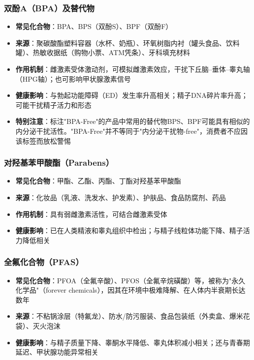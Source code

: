 \documentclass[12pt,a4paper,twoside]{ctexbook}
\begin{document}
\subsubsection{双酚A（BPA）及替代物}

\begin{itemize}[leftmargin=2cm]
	\item \textbf{常见化合物}：BPA、BPS（双酚S）、BPF（双酚F）
	\item \textbf{来源}：聚碳酸酯塑料容器（水杯、奶瓶）、环氧树脂内衬（罐头食品、饮料罐）、热敏收据纸（购物小票、ATM凭条）、牙科填充材料
	\item \textbf{作用机制}：雌激素受体激动剂，可模拟雌激素效应，干扰下丘脑--垂体--睾丸轴（HPG轴）；也可影响甲状腺激素信号
	\item \textbf{健康影响}：与勃起功能障碍（ED）发生率升高相关；精子DNA碎片率升高；可能干扰精子活力和形态
	\item \textbf{特别注意}：标注"BPA-Free"的产品中常用的替代物BPS、BPF可能具有相似的内分泌干扰活性。"BPA-Free"并不等同于"内分泌干扰物-free"，消费者不应因该标签而放松警惕
\end{itemize}

\subsubsection{对羟基苯甲酸酯（Parabens）}

\begin{itemize}[leftmargin=2cm]
	\item \textbf{常见化合物}：甲酯、乙酯、丙酯、丁酯对羟基苯甲酸酯
	\item \textbf{来源}：化妆品（乳液、洗发水、护发素）、护肤品、食品防腐剂、药品
	\item \textbf{作用机制}：具有弱雌激素活性，可结合雌激素受体
	\item \textbf{健康影响}：已在人类精液和睾丸组织中检出；与精子线粒体功能下降、精子活力降低相关
\end{itemize}

\subsubsection{全氟化合物（PFAS）}

\begin{itemize}[leftmargin=2cm]
	\item \textbf{常见化合物}：PFOA（全氟辛酸）、PFOS（全氟辛烷磺酸）等，被称为"永久化学品"（forever chemicals），因其在环境中极难降解、在人体内半衰期长达数年
	\item \textbf{来源}：不粘锅涂层（特氟龙）、防水/防污服装、食品包装纸（外卖盒、爆米花袋）、灭火泡沫
	\item \textbf{健康影响}：与精子质量下降、睾酮水平降低、睾丸体积减小相关；还与青春期延迟、甲状腺功能异常相关
\end{itemize}
\end{document}

